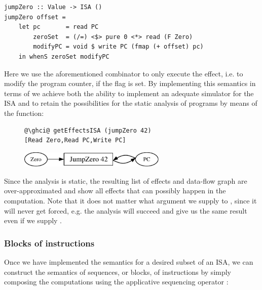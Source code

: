 \begin{verbatim}
jumpZero :: Value -> ISA ()
jumpZero offset =
    let pc       = read PC
        zeroSet  = (/=) <$> pure 0 <*> read (F Zero)
        modifyPC = void $ write PC (fmap (+ offset) pc)
    in whenS zeroSet modifyPC
\end{verbatim}

Here we use the aforementioned  combinator to only execute the effect, i.e.
to modify the program counter, if the flag is set. By implementing this semantics in terms of
 we achieve both the ability to implement an adequate simulator for the ISA and
to retain the possibilities for the static analysis of programs by means of the 
function:

\begin{figure}[!h]
 \begin{minipage}{0.45\textwidth}
\raggedleft
\begin{verbatim}
@\ghci@ getEffectsISA (jumpZero 42)
[Read Zero,Read PC,Write PC]
\end{verbatim}
 \end{minipage}
 \begin{minipage}{0.45\textwidth}
  \centering
  \includegraphics[width=7cm]{./img/ISA/jumpZero.pdf}
 \end{minipage}
\end{figure}

Since the analysis is static, the resulting list of effects and data-flow graph are
over-approximated and show all effects that can possibly happen in the computation.
Note that it does not matter what argument we supply to , since it will
never get forced, e.g. the analysis will succeed and give us the same result even
if we supply .

\subsubsection{\textbf{Blocks of instructions}}

Once we have implemented the semantics for a desired subset of an ISA, we can construct the
semantics of sequences, or blocks, of instructions by simply composing the  computations
using the applicative sequencing operator \hs{*>}:

